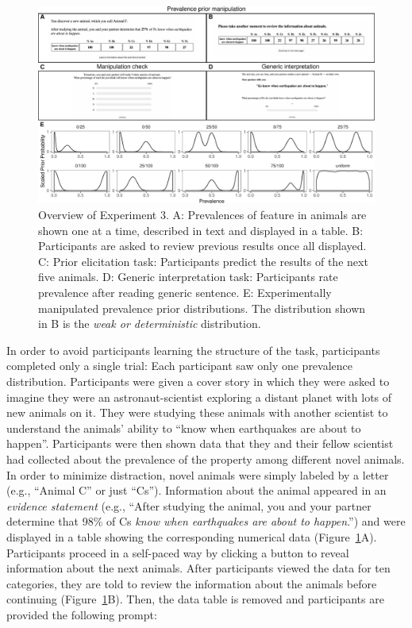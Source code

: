\documentclass[,man,floatsintext]{apa6}
\theoremstyle{definition}
\theoremstyle{definition}
\theoremstyle{definition}
\theoremstyle{remark}
\begin{document}
\begin{figure}
\centering
\includegraphics{genint_files/figure-latex/priorManipulationExpt-1.pdf}
\caption{\label{fig:priorManipulationExpt}Overview of Experiment 3. A:
Prevalences of feature in animals are shown one at a time, described in
text and displayed in a table. B: Participants are asked to review
previous results once all displayed. C: Prior elicitation task:
Participants predict the results of the next five animals. D: Generic
interpretation task: Participants rate prevalence after reading generic
sentence. E: Experimentally manipulated prevalence prior distributions.
The distribution shown in B is the \emph{weak or deterministic}
distribution.}
\end{figure}

In order to avoid participants learning the structure of the task,
participants completed only a single trial: Each participant saw only
one prevalence distribution. Participants were given a cover story in
which they were asked to imagine they were an astronaut-scientist
exploring a distant planet with lots of new animals on it. They were
studying these animals with another scientist to understand the animals'
ability to \enquote{know when earthquakes are about to happen}.
Participants were then shown data that they and their fellow scientist
had collected about the prevalence of the property among different novel
animals. In order to minimize distraction, novel animals were simply
labeled by a letter (e.g., \enquote{Animal C} or just \enquote{Cs}).
Information about the animal appeared in an \emph{evidence statement}
(e.g., \enquote{After studying the animal, you and your partner
determine that 98\% of Cs \emph{know when earthquakes are about to
happen}.}) and were displayed in a table showing the corresponding
numerical data (Figure~\ref{fig:priorManipulationExpt}A). Participants
proceed in a self-paced way by clicking a button to reveal information
about the next animals. After participants viewed the data for ten
categories, they are told to review the information about the animals
before continuing (Figure~\ref{fig:priorManipulationExpt}B). Then, the
data table is removed and participants are provided the following
prompt:
\end{document}
